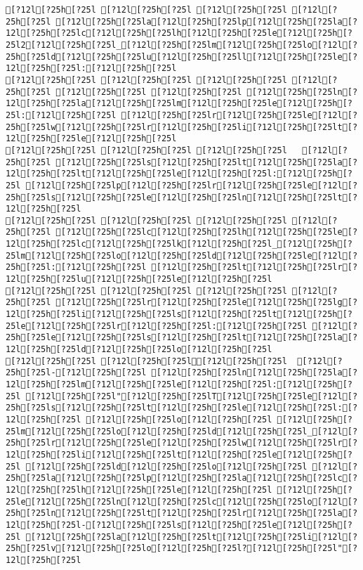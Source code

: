 \documentclass{scrartcl}
\begin{document}
\begin{Verbatim}
[?12l[?25h[?25l [?12l[?25h[?25l [?12l[?25h[?25l [?12l[?25h[?25l [?12l[?25h[?25la[?12l[?25h[?25lp[?12l[?25h[?25la[?12l[?25h[?25lc[?12l[?25h[?25lh[?12l[?25h[?25le[?12l[?25h[?25l2[?12l[?25h[?25l_[?12l[?25h[?25lm[?12l[?25h[?25lo[?12l[?25h[?25ld[?12l[?25h[?25lu[?12l[?25h[?25ll[?12l[?25h[?25le[?12l[?25h[?25l:[?12l[?25h[?25l
[?12l[?25h[?25l [?12l[?25h[?25l [?12l[?25h[?25l [?12l[?25h[?25l [?12l[?25h[?25l [?12l[?25h[?25l [?12l[?25h[?25ln[?12l[?25h[?25la[?12l[?25h[?25lm[?12l[?25h[?25le[?12l[?25h[?25l:[?12l[?25h[?25l [?12l[?25h[?25lr[?12l[?25h[?25le[?12l[?25h[?25lw[?12l[?25h[?25lr[?12l[?25h[?25li[?12l[?25h[?25lt[?12l[?25h[?25le[?12l[?25h[?25l
[?12l[?25h[?25l [?12l[?25h[?25l [?12l[?25h[?25l   [?12l[?25h[?25l [?12l[?25h[?25ls[?12l[?25h[?25lt[?12l[?25h[?25la[?12l[?25h[?25lt[?12l[?25h[?25le[?12l[?25h[?25l:[?12l[?25h[?25l [?12l[?25h[?25lp[?12l[?25h[?25lr[?12l[?25h[?25le[?12l[?25h[?25ls[?12l[?25h[?25le[?12l[?25h[?25ln[?12l[?25h[?25lt[?12l[?25h[?25l
[?12l[?25h[?25l [?12l[?25h[?25l [?12l[?25h[?25l [?12l[?25h[?25l [?12l[?25h[?25lc[?12l[?25h[?25lh[?12l[?25h[?25le[?12l[?25h[?25lc[?12l[?25h[?25lk[?12l[?25h[?25l_[?12l[?25h[?25lm[?12l[?25h[?25lo[?12l[?25h[?25ld[?12l[?25h[?25le[?12l[?25h[?25l:[?12l[?25h[?25l [?12l[?25h[?25lt[?12l[?25h[?25lr[?12l[?25h[?25lu[?12l[?25h[?25le[?12l[?25h[?25l
[?12l[?25h[?25l [?12l[?25h[?25l [?12l[?25h[?25l [?12l[?25h[?25l [?12l[?25h[?25lr[?12l[?25h[?25le[?12l[?25h[?25lg[?12l[?25h[?25li[?12l[?25h[?25ls[?12l[?25h[?25lt[?12l[?25h[?25le[?12l[?25h[?25lr[?12l[?25h[?25l:[?12l[?25h[?25l [?12l[?25h[?25le[?12l[?25h[?25ls[?12l[?25h[?25lt[?12l[?25h[?25la[?12l[?25h[?25ld[?12l[?25h[?25lo[?12l[?25h[?25l
[?12l[?25h[?25l [?12l[?25h[?25l[?12l[?25h[?25l  [?12l[?25h[?25l-[?12l[?25h[?25l [?12l[?25h[?25ln[?12l[?25h[?25la[?12l[?25h[?25lm[?12l[?25h[?25le[?12l[?25h[?25l:[?12l[?25h[?25l [?12l[?25h[?25l"[?12l[?25h[?25lT[?12l[?25h[?25le[?12l[?25h[?25ls[?12l[?25h[?25lt[?12l[?25h[?25le[?12l[?25h[?25l:[?12l[?25h[?25l [?12l[?25h[?25lo[?12l[?25h[?25l [?12l[?25h[?25lm[?12l[?25h[?25lo[?12l[?25h[?25ld[?12l[?25h[?25l_[?12l[?25h[?25lr[?12l[?25h[?25le[?12l[?25h[?25lw[?12l[?25h[?25lr[?12l[?25h[?25li[?12l[?25h[?25lt[?12l[?25h[?25le[?12l[?25h[?25l [?12l[?25h[?25ld[?12l[?25h[?25lo[?12l[?25h[?25l [?12l[?25h[?25la[?12l[?25h[?25lp[?12l[?25h[?25la[?12l[?25h[?25lc[?12l[?25h[?25lh[?12l[?25h[?25le[?12l[?25h[?25l [?12l[?25h[?25le[?12l[?25h[?25ln[?12l[?25h[?25lc[?12l[?25h[?25lo[?12l[?25h[?25ln[?12l[?25h[?25lt[?12l[?25h[?25lr[?12l[?25h[?25la[?12l[?25h[?25l-[?12l[?25h[?25ls[?12l[?25h[?25le[?12l[?25h[?25l [?12l[?25h[?25la[?12l[?25h[?25lt[?12l[?25h[?25li[?12l[?25h[?25lv[?12l[?25h[?25lo[?12l[?25h[?25l?[?12l[?25h[?25l"[?12l[?25h[?25l

\end{Verbatim}
\end{document}
